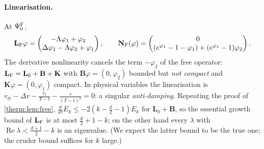 \paragraph{Linearisation.}  At $\Psi^{\rm F}_0$,
\begin{equation}\label{therm:eq:linfull}
  \mathbf L_{\rm F}\varphi=\begin{pmatrix}-\Lambda\varphi_1+\varphi_2\\ \Delta\varphi_1-\Lambda\varphi_2+\varphi_1\end{pmatrix},\qquad
  \mathbf N_{\rm F}(\varphi)=\begin{pmatrix}0\\ (e^{\varphi_1}-1-\varphi_1)+(e^{\varphi_1}-1)\varphi_2\end{pmatrix}.
\end{equation}
The derivative nonlinearity cancels the term $-\varphi_2$ of the free operator:
$\mathbf L_{\rm F}=\mathbf L_0+\mathbf B+\mathbf K$ with $\mathbf B\varphi=(0,\varphi_2)$ bounded but \emph{not compact} and
$\mathbf K\varphi=(0,\varphi_1)$ compact.  In physical variables the linearisation is
$v_{tt}-\Delta v-\frac{v_t}{T-t}-\frac{v}{(T-t)^2}=0$: a singular \emph{anti-damping}.
Repeating the proof of \cref{therm:lem:free}, $\frac{d}{d\tau}E_k\le-2(k-\frac d2-1)E_k$ for
$\mathbf L_0+\mathbf B$, so the essential growth bound of $\mathbf L_{\rm F}$ is at most $\frac d2+1-k$; on
the other hand every $\lambda$ with $\operatorname{Re}\lambda<\frac{d+1}{2}-k$ is an eigenvalue.  (We expect the
latter bound to be the true one; the cruder bound suffices for $k$ large.)

